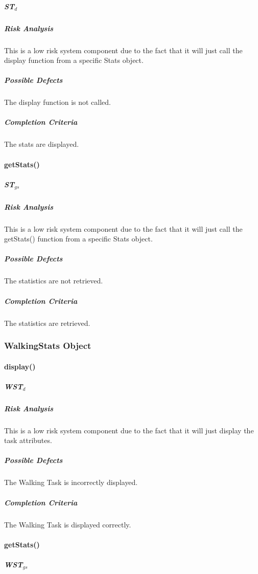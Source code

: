 \documentclass{article}
\begin{document}
\subparagraph{ST$_{d}$}

\subparagraph{Risk Analysis}
This is a low risk system component due to the fact that it will just call the display function from a specific Stats object.

\subparagraph{Possible Defects}
The display function is not called.

\subparagraph{Completion Criteria}
The stats are displayed.

\paragraph{getStats()}

\subparagraph{ST$_{gs}$}

\subparagraph{Risk Analysis}
This is a low risk system component due to the fact that it will just call the getStats() function from a specific Stats object.

\subparagraph{Possible Defects}
The statistics are not retrieved.

\subparagraph{Completion Criteria}
The statistics are retrieved.


\subsubsection{WalkingStats Object}

\paragraph{display()}

\subparagraph{WST$_{d}$}

\subparagraph{Risk Analysis}
This is a low risk system component due to the fact that it will just display the task attributes.

\subparagraph{Possible Defects}
The Walking Task is incorrectly displayed.

\subparagraph{Completion Criteria}
The Walking Task is displayed correctly.

\paragraph{getStats()}

\subparagraph{WST$_{gs}$}
\end{document}
